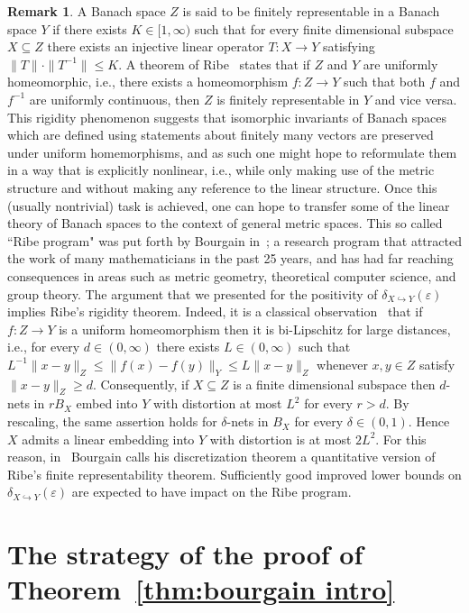 \documentclass[12pt,reqno]{amsart}
\theoremstyle{plain}
\theoremstyle{definition}
\newtheorem{remark}[definition]{Remark}
\newcommand{\e}{\varepsilon}
\renewcommand{\d}{\delta}
\renewcommand{\le}{\leqslant}
\renewcommand{\ge}{\geqslant}
\begin{document}
\begin{remark}
A Banach space $Z$ is said to be finitely representable in a Banach space $Y$ if there exists $K\in [1,\infty)$ such that for every finite dimensional subspace $X\subseteq Z$ there exists an injective linear operator $T:X\to Y$ satisfying $\|T\|\cdot\|T^{-1}\|\le K$. A theorem of Ribe~\cite{Ribe76} states that if $Z$ and $Y$ are uniformly homeomorphic, i.e., there exists a homeomorphism $f:Z\to Y$ such that both $f$ and $f^{-1}$ are uniformly continuous, then $Z$ is finitely representable in $Y$ and vice versa. This  rigidity phenomenon suggests that isomorphic invariants of Banach spaces which are defined using statements about finitely many vectors are preserved under uniform homemorphisms, and as such one might hope to reformulate them in a way that is explicitly nonlinear, i.e., while only making use of the metric structure and without making any reference to the linear structure. Once this (usually nontrivial) task is achieved, one can hope to transfer some of the linear theory of Banach spaces to the context of general metric spaces. This so called ``Ribe program" was put forth by Bourgain in~\cite{Bou86}; a research program that attracted the work of many mathematicians in the past 25 years, and has had far reaching consequences in areas such as metric geometry, theoretical computer science, and group theory.  The argument that we presented for the positivity of $\delta_{X\hookrightarrow Y}(\e)$ implies Ribe's rigidity theorem. Indeed, it is a classical observation~\cite{CK63} that if $f:Z\to Y$ is a uniform homeomorphism then it is bi-Lipschitz for large distances, i.e., for every $d\in (0,\infty)$ there exists $L\in (0,\infty)$ such that $L^{-1}\|x-y\|_Z\le \|f(x)-f(y)\|_Y\le L\|x-y\|_Z$ whenever $x,y\in Z$ satisfy $\|x-y\|_Z\ge d$. Consequently, if $X\subseteq Z$ is a finite dimensional subspace then $d$-nets in $rB_X$ embed into $Y$ with distortion at most $L^2$ for every $r>d$. By rescaling, the same assertion holds for $\d$-nets in $B_X$ for every $\d\in (0,1)$. Hence $X$ admits a linear embedding into $Y$ with distortion is at most $2L^2$. For this reason, in~\cite{Bou87} Bourgain calls his discretization theorem a quantitative version of Ribe's finite representability theorem. Sufficiently good improved lower bounds on $\delta_{X\hookrightarrow Y}(\e)$ are expected to have impact on the Ribe program.
\end{remark}

\section{The strategy of the proof of Theorem~\ref{thm:bourgain intro}}\label{sec:strategy}
\end{document}
